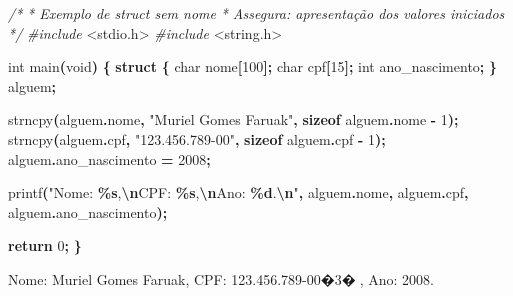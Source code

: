\documentclass[
  11pt,
  a4paper,
]{scrbook}
\newenvironment{Shaded}{\begin{snugshade}}{\end{snugshade}}
\newcommand{\CommentTok}[1]{\textcolor[rgb]{0.56,0.35,0.01}{\textit{#1}}}
\newcommand{\ControlFlowTok}[1]{\textcolor[rgb]{0.13,0.29,0.53}{\textbf{#1}}}
\newcommand{\DataTypeTok}[1]{\textcolor[rgb]{0.13,0.29,0.53}{#1}}
\newcommand{\DecValTok}[1]{\textcolor[rgb]{0.00,0.00,0.81}{#1}}
\newcommand{\ImportTok}[1]{#1}
\newcommand{\KeywordTok}[1]{\textcolor[rgb]{0.13,0.29,0.53}{\textbf{#1}}}
\newcommand{\NormalTok}[1]{#1}
\newcommand{\OperatorTok}[1]{\textcolor[rgb]{0.81,0.36,0.00}{\textbf{#1}}}
\newcommand{\PreprocessorTok}[1]{\textcolor[rgb]{0.56,0.35,0.01}{\textit{#1}}}
\newcommand{\SpecialCharTok}[1]{\textcolor[rgb]{0.81,0.36,0.00}{\textbf{#1}}}
\newcommand{\StringTok}[1]{\textcolor[rgb]{0.31,0.60,0.02}{#1}}
\begin{document}
\begin{Shaded}
\begin{Highlighting}[]
\CommentTok{/*}
\CommentTok{ * Exemplo de struct sem nome}
\CommentTok{ * Assegura: apresentação dos valores iniciados}
\CommentTok{ */}
\PreprocessorTok{\#include }\ImportTok{\textless{}stdio.h\textgreater{}}
\PreprocessorTok{\#include }\ImportTok{\textless{}string.h\textgreater{}}

\DataTypeTok{int}\NormalTok{ main}\OperatorTok{(}\DataTypeTok{void}\OperatorTok{)} \OperatorTok{\{}
    \KeywordTok{struct} \OperatorTok{\{}
        \DataTypeTok{char}\NormalTok{ nome}\OperatorTok{[}\DecValTok{100}\OperatorTok{];}
        \DataTypeTok{char}\NormalTok{ cpf}\OperatorTok{[}\DecValTok{15}\OperatorTok{];}
        \DataTypeTok{int}\NormalTok{ ano\_nascimento}\OperatorTok{;}
    \OperatorTok{\}}\NormalTok{ alguem}\OperatorTok{;}
    
\NormalTok{    strncpy}\OperatorTok{(}\NormalTok{alguem}\OperatorTok{.}\NormalTok{nome}\OperatorTok{,} \StringTok{"Muriel Gomes Faruak"}\OperatorTok{,} \KeywordTok{sizeof}\NormalTok{ alguem}\OperatorTok{.}\NormalTok{nome }\OperatorTok{{-}} \DecValTok{1}\OperatorTok{);}
\NormalTok{    strncpy}\OperatorTok{(}\NormalTok{alguem}\OperatorTok{.}\NormalTok{cpf}\OperatorTok{,} \StringTok{"123.456.789{-}00"}\OperatorTok{,} \KeywordTok{sizeof}\NormalTok{ alguem}\OperatorTok{.}\NormalTok{cpf }\OperatorTok{{-}} \DecValTok{1}\OperatorTok{);}
\NormalTok{    alguem}\OperatorTok{.}\NormalTok{ano\_nascimento }\OperatorTok{=} \DecValTok{2008}\OperatorTok{;}

\NormalTok{    printf}\OperatorTok{(}\StringTok{"Nome: }\SpecialCharTok{\%s}\StringTok{,}\SpecialCharTok{\textbackslash{}n}\StringTok{CPF: }\SpecialCharTok{\%s}\StringTok{,}\SpecialCharTok{\textbackslash{}n}\StringTok{Ano: }\SpecialCharTok{\%d}\StringTok{.}\SpecialCharTok{\textbackslash{}n}\StringTok{"}\OperatorTok{,}\NormalTok{ alguem}\OperatorTok{.}\NormalTok{nome}\OperatorTok{,}\NormalTok{ alguem}\OperatorTok{.}\NormalTok{cpf}\OperatorTok{,}
\NormalTok{           alguem}\OperatorTok{.}\NormalTok{ano\_nascimento}\OperatorTok{);}

    \ControlFlowTok{return} \DecValTok{0}\OperatorTok{;}
\OperatorTok{\}}
\end{Highlighting}
\end{Shaded}

\begin{Shaded}
\begin{Highlighting}[]
\NormalTok{Nome: Muriel Gomes Faruak,}
\NormalTok{CPF: 123.456.789{-}00�3�,}
\NormalTok{Ano: 2008.}
\end{Highlighting}
\end{Shaded}
\end{document}
